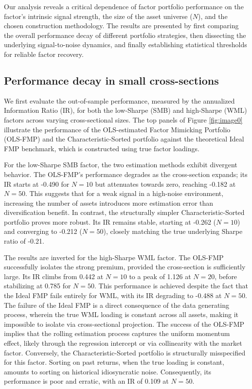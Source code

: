 \documentclass[]{article}
\begin{document}
Our analysis reveals a critical dependence of factor portfolio performance on the factor's intrinsic signal strength, the size of the asset universe ($N$), and the chosen construction methodology. The results are presented by first comparing the overall performance decay of different portfolio strategies, then dissecting the underlying signal-to-noise dynamics, and finally establishing statistical thresholds for reliable factor recovery.

\subsection{Performance decay in small cross-sections}

We first evaluate the out-of-sample performance, measured by the annualized Information Ratio (IR), for both the low-Sharpe (SMB) and high-Sharpe (WML) factors across varying cross-sectional sizes. The top panels of Figure \ref{fig:image0} illustrate the performance of the OLS-estimated Factor Mimicking Portfolio (OLS-FMP) and the Characteristic-Sorted portfolio against the theoretical Ideal FMP benchmark, which is constructed using true factor loadings.

For the low-Sharpe SMB factor, the two estimation methods exhibit divergent behavior. The OLS-FMP's performance degrades as the cross-section expands; its IR starts at -0.490 for $N=10$ but attenuates towards zero, reaching -0.182 at $N=50$. This suggests that for a weak signal in a high-noise environment, increasing the number of assets introduces more estimation error than diversification benefit. In contrast, the structurally simpler Characteristic-Sorted portfolio proves more robust. Its IR remains stable, starting at -0.262 ($N=10$) and converging to -0.212 ($N=50$), closely matching the true underlying Sharpe ratio of -0.21.

The results are inverted for the high-Sharpe WML factor. The OLS-FMP successfully isolates the strong premium, provided the cross-section is sufficiently large. Its IR climbs from 0.442 at $N=10$ to a peak of 1.126 at $N=20$, before stabilizing at 0.785 for $N=50$. This performance is achieved despite the fact that the Ideal FMP fails entirely for WML, with its IR degrading to -0.488 at $N=50$. The failure of the Ideal FMP is a direct consequence of the data generating process, wherein the true WML loading is constant across all assets, making it impossible to isolate via cross-sectional projection. The success of the OLS-FMP implies that the rolling estimation process captures the uniform momentum effect, likely through the regression intercept or via collinearity with the market factor. Conversely, the Characteristic-Sorted portfolio is structurally misspecified for this factor. Sorting on past returns, when the true loading is constant, amounts to sorting on historical idiosyncratic noise. Consequently, its performance is poor and erratic, with an IR of 0.109 at $N=50$.
\end{document}
